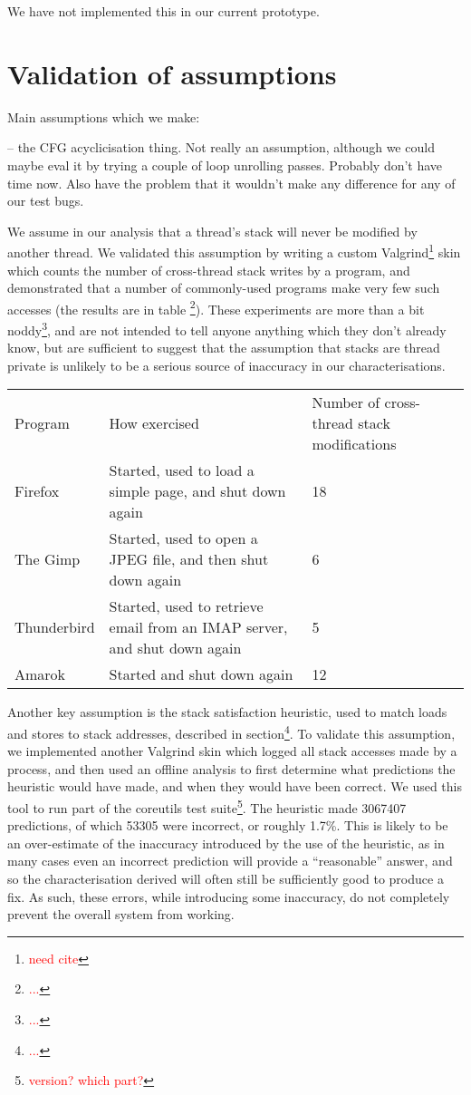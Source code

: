 \documentclass[10pt,twocolumn,preprint,natbib,authoryear]{sigplanconf}
\newcommand{\editorial}[1]{\textcolor{red}{\footnote{\textcolor{red}{#1}}}}
\newcommand{\needCite}{\editorial{need cite}}
\begin{document}
We have not implemented this in our current prototype.

\section{Validation of assumptions}

Main assumptions which we make:

-- the CFG acyclicisation thing.  Not really an assumption, although
we could maybe eval it by trying a couple of loop unrolling passes.
Probably don't have time now.  Also have the problem that it wouldn't
make any difference for any of our test bugs.

We assume in our analysis that a thread's stack will never be modified
by another thread.  We validated this assumption by writing a custom
Valgrind\needCite{} skin which counts the number of cross-thread stack
writes by a program, and demonstrated that a number of commonly-used
programs make very few such accesses (the results are in table
\editorial{...}).  These experiments are more than a bit
noddy\editorial{...}, and are not intended to tell anyone anything
which they don't already know, but are sufficient to suggest that the
assumption that stacks are thread private is unlikely to be a serious
source of inaccuracy in our characterisations.

\begin{tabular}{lll}
Program & How exercised & Number of cross-thread stack modifications \\
Firefox & Started, used to load a simple page, and shut down again & 18 \\
The Gimp & Started, used to open a JPEG file, and then shut down again & 6 \\
Thunderbird & Started, used to retrieve email from an IMAP server, and shut down again & 5\\
Amarok & Started and shut down again & 12
\end{tabular}

Another key assumption is the stack satisfaction heuristic, used to
match loads and stores to stack addresses, described in
section\editorial{...}.  To validate this assumption, we implemented
another Valgrind skin which logged all stack accesses made by a
process, and then used an offline analysis to first determine what
predictions the heuristic would have made, and when they would have
been correct.  We used this tool to run part of the coreutils test
suite\editorial{version? which part?}.  The heuristic made 3067407
predictions, of which 53305 were incorrect, or roughly 1.7\%.  This is
likely to be an over-estimate of the inaccuracy introduced by the use
of the heuristic, as in many cases even an incorrect prediction will
provide a ``reasonable'' answer, and so the characterisation derived
will often still be sufficiently good to produce a fix.  As such,
these errors, while introducing some inaccuracy, do not completely
prevent the overall system from working.
\end{document}
